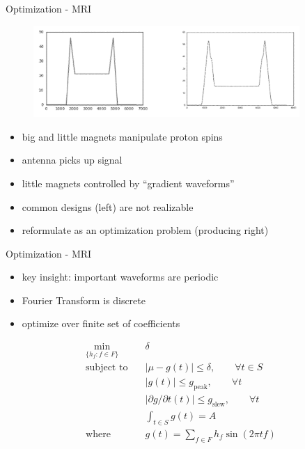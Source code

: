 \documentclass[presentation]{beamer}
\begin{document}
\begin{frame}{Optimization - MRI}
\begin{figure}
\includegraphics[width=0.9\textwidth]{figs/BeforeAfterMRI.png}
\end{figure}
  \begin{itemize}
  \item big and little magnets manipulate proton spins
  \item antenna picks up signal
  \item little magnets controlled by ``gradient waveforms''
  \item common designs (left) are not realizable
  \item reformulate as an optimization problem (producing right)
  \end{itemize}
\end{frame}

\begin{frame}{Optimization - MRI}
  \begin{itemize}
  \item key insight:  important waveforms are periodic
  \item Fourier Transform is discrete
  \item optimize over finite set of coefficients
  \end{itemize}
\begin{align}
 \operatorname{min}_{\{h_f:f\in F\}}\quad & \delta \\
   \text{subject to}\quad & \left| \mu - g(t) \right| \le \delta, \qquad \forall t \in S \\
   & \left| g(t) \right| \le g_{\text{peak}}, \qquad \forall t \\
   & \left| \partial g / \partial t (t) \right| \le g_{\text{slew}}, \qquad \forall t \\
   & \int_{ t \in S } g(t) = A \\
   \text{where}\quad & g(t) = \sum_{f\in F} h_f \sin(2\pi t f)
\end{align}
\end{frame}
\end{document}
